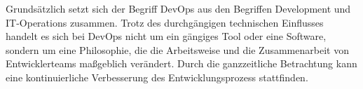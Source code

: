 \label{ref_devops}
Grundsätzlich setzt sich der Begriff DevOps aus den Begriffen Development und IT-Operations zusammen. Trotz des durchgängigen technischen Einflusses handelt es sich bei DevOps nicht um ein gängiges Tool oder eine Software, sondern um eine Philosophie, die die Arbeitsweise und die Zusammenarbeit von Entwicklerteams maßgeblich verändert. Durch die ganzzeitliche Betrachtung kann eine kontinuierliche Verbesserung des Entwicklungsprozess stattfinden.